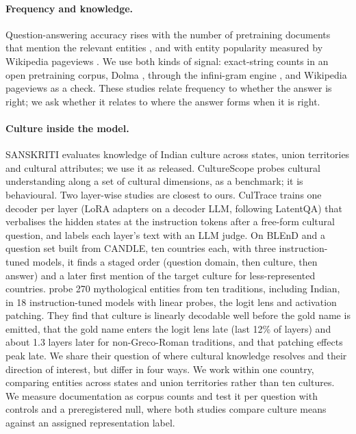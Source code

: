 \paragraph{Frequency and knowledge.}
Question-answering accuracy rises with the number of pretraining documents that mention the relevant entities \citep{kandpal2023longtail}, and with entity popularity measured by Wikipedia pageviews \citep{mallen-etal-2023-trust}.
We use both kinds of signal: exact-string counts in an open pretraining corpus, Dolma \citep{soldaini-etal-2024-dolma}, through the infini-gram engine \citep{liu2024infinigram}, and Wikipedia pageviews as a check.
These studies relate frequency to whether the answer is right; we ask whether it relates to where the answer forms when it is right.

\paragraph{Culture inside the model.}
SANSKRITI \citep{maji-etal-2025-sanskriti} evaluates knowledge of Indian culture across states, union territories and cultural attributes; we use it as released.
CultureScope \citep{zhang2025culturescope} probes cultural understanding along a set of cultural dimensions, as a benchmark; it is behavioural.
Two layer-wise studies are closest to ours.
CulTrace \citep{yu2025cultrace} trains one decoder per layer (LoRA adapters on a decoder LLM, following LatentQA) that verbalises the hidden states at the instruction tokens after a free-form cultural question, and labels each layer's text with an LLM judge.
On BLEnD and a question set built from CANDLE, ten countries each, with three instruction-tuned models, it finds a staged order (question domain, then culture, then answer) and a later first mention of the target culture for less-represented countries.
\citet{chelombitko2026cultural} probe 270 mythological entities from ten traditions, including Indian, in 18 instruction-tuned models with linear probes, the logit lens and activation patching.
They find that culture is linearly decodable well before the gold name is emitted, that the gold name enters the logit lens late (last 12\% of layers) and about 1.3 layers later for non-Greco-Roman traditions, and that patching effects peak late.
We share their question of where cultural knowledge resolves and their direction of interest, but differ in four ways.
We work within one country, comparing entities across \nStates{} states and union territories rather than ten cultures.
We measure documentation as corpus counts and test it per question with controls and a preregistered null, where both studies compare culture means against an assigned representation label.
